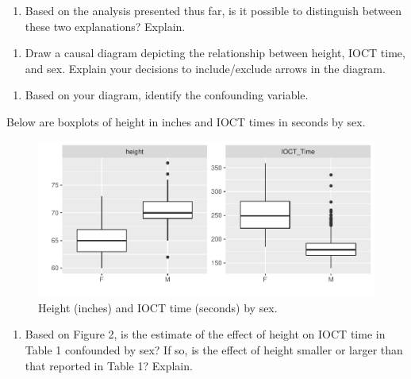 \documentclass[
]{book}
\providecommand{\tightlist}{%
  \setlength{\itemsep}{0pt}\setlength{\parskip}{0pt}}
\begin{document}
\vspace{1in}

\begin{enumerate}
\def\labelenumi{\arabic{enumi}.}
\setcounter{enumi}{9}
\tightlist
\item
  Based on the analysis presented thus far, is it possible to distinguish between these two explanations? Explain.
\end{enumerate}

\vspace{1in}

\begin{enumerate}
\def\labelenumi{\arabic{enumi}.}
\setcounter{enumi}{10}
\tightlist
\item
  Draw a causal diagram depicting the relationship between height, IOCT time, and sex. Explain your decisions to include/exclude arrows in the diagram.
\end{enumerate}

\vspace{1in}

\begin{enumerate}
\def\labelenumi{\arabic{enumi}.}
\setcounter{enumi}{11}
\tightlist
\item
  Based on your diagram, identify the confounding variable.
\end{enumerate}

\vspace{0.5in}

Below are boxplots of height in inches and IOCT times in seconds by sex.

\begin{figure}
\centering
\includegraphics{MA206supplement_files/figure-latex/unnamed-chunk-17-1.pdf}
\caption{\label{fig:unnamed-chunk-17}Height (inches) and IOCT time (seconds) by sex.}
\end{figure}

\begin{enumerate}
\def\labelenumi{\arabic{enumi}.}
\setcounter{enumi}{12}
\tightlist
\item
  Based on Figure 2, is the estimate of the effect of height on IOCT time in Table 1 confounded by sex? If so, is the effect of height smaller or larger than that reported in Table 1? Explain.
\end{enumerate}
\end{document}

